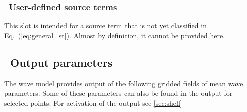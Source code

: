 \vsssub
\subsubsection{~User-defined source terms} \label{sec:sxx}
\vsssub

This slot is intended for a source term that is not yet classified in
Eq.~(\ref{eq:general_st}). Almost by definition, it cannot be provided here.


\vssub
\subsection{~Output parameters} \label{sub:outpars}
\vssub

The wave model provides output of the following gridded fields of mean wave
parameters. Some of these parameters can also be found in the output for
selected points. For activation of the output see \para\ref{sec:shell}

